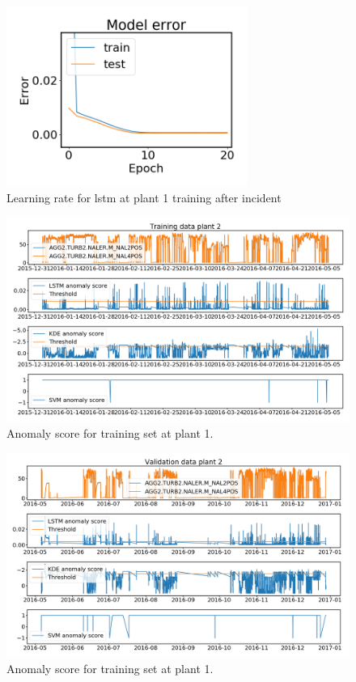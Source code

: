     
    \begin{figure}
        \centering
        \includegraphics[width=0.7\textwidth]{report/figures/analysis/plant2_train_long/lstm_model_errror.png}
        \caption{Learning rate for lstm at plant 1 training after incident}
        \label{fig:lstm_training_plant1}
    \end{figure}
    
    \begin{figure}
        \centering
        \includegraphics[width=\textwidth]{report/figures/analysis/plant2_train_long/training_data_anomaly.png}
        \caption{Anomaly score for training set at plant 1.}
        \label{fig:anomaly_training_plant1}
    \end{figure}
    
    \begin{figure}
        \centering
        \includegraphics[width=\textwidth]{report/figures/analysis/plant2_train_long/test_data_anomaly.png}
        \caption{Anomaly score for training set at plant 1.}
        \label{fig:anomaly_training_plant1}
    \end{figure}
    
